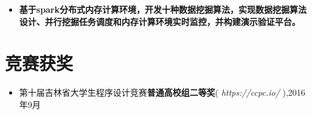 \documentclass{resume}
\begin{document}
\begin{itemize}
  \item \textbf{基于spark分布式内存计算环境，开发十种数据挖掘算法，实现数据挖掘算法设计、并行挖掘任务调度和内存计算环境实时监控，并构建演示验证平台。}
\end{itemize}





\section{竞赛获奖}
\begin{itemize}[parsep=0.2ex]
  \item 第十届吉林省大学生程序设计竞赛\textbf{普通高校组二等奖}( \textit{https://ccpc.io/} ),2016 年9月
\end{itemize}




%
%
\end{document}
